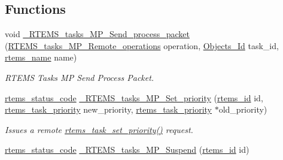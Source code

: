 \subsection*{Functions}
\begin{DoxyCompactItemize}
\item 
void \mbox{\hyperlink{group__ClassicTaskMP_gad070e30bf976120083bbc1af1a9db9d8}{\+\_\+\+R\+T\+E\+M\+S\+\_\+tasks\+\_\+\+M\+P\+\_\+\+Send\+\_\+process\+\_\+packet}} (\mbox{\hyperlink{group__ClassicTaskMP_ga8898253dbfcff93eb97b8646eefd1fa3}{R\+T\+E\+M\+S\+\_\+tasks\+\_\+\+M\+P\+\_\+\+Remote\+\_\+operations}} operation, \mbox{\hyperlink{group__RTEMSScoreObject_ga5821f52a51072941bdd603e542d0863e}{Objects\+\_\+\+Id}} task\+\_\+id, \mbox{\hyperlink{group__ClassicTasks_ga55fb63c49f68c0cbd9bee004da15b1fd}{rtems\+\_\+name}} name)
\begin{DoxyCompactList}\small\item\em R\+T\+E\+MS Tasks MP Send Process Packet. \end{DoxyCompactList}\item 
\mbox{\label{group__ClassicTaskMP_ga579256dfe2e4f0a0bad2a14299a3703f}} 
\mbox{\hyperlink{group__ClassicStatus_ga545d41846817eaba6143d52ee4d9e9fe}{rtems\+\_\+status\+\_\+code}} \mbox{\hyperlink{group__ClassicTaskMP_ga579256dfe2e4f0a0bad2a14299a3703f}{\+\_\+\+R\+T\+E\+M\+S\+\_\+tasks\+\_\+\+M\+P\+\_\+\+Set\+\_\+priority}} (\mbox{\hyperlink{group__ClassicTasks_gab20892b814dced7dd4e5b9bf42becd57}{rtems\+\_\+id}} id, \mbox{\hyperlink{group__ClassicTasks_gaa80a0c0938307d1e99d0eb5fee765b47}{rtems\+\_\+task\+\_\+priority}} new\+\_\+priority, \mbox{\hyperlink{group__ClassicTasks_gaa80a0c0938307d1e99d0eb5fee765b47}{rtems\+\_\+task\+\_\+priority}} $\ast$old\+\_\+priority)
\begin{DoxyCompactList}\small\item\em Issues a remote \mbox{\hyperlink{group__ClassicTasks_gaeff43063975950a2436c0fddf96f9b33}{rtems\+\_\+task\+\_\+set\+\_\+priority()}} request. \end{DoxyCompactList}\item 
\mbox{\label{group__ClassicTaskMP_gaac8446c60251b5279359381d92e47dde}} 
\mbox{\hyperlink{group__ClassicStatus_ga545d41846817eaba6143d52ee4d9e9fe}{rtems\+\_\+status\+\_\+code}} \mbox{\hyperlink{group__ClassicTaskMP_gaac8446c60251b5279359381d92e47dde}{\+\_\+\+R\+T\+E\+M\+S\+\_\+tasks\+\_\+\+M\+P\+\_\+\+Suspend}} (\mbox{\hyperlink{group__ClassicTasks_gab20892b814dced7dd4e5b9bf42becd57}{rtems\+\_\+id}} id)

\end{DoxyCompactItemize}
